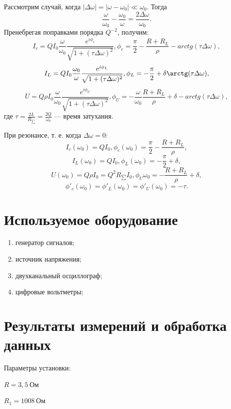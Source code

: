 \documentclass[a4paper, 12pt]{article}
\begin{document}
Рассмотрим случай, когда $|\Delta\omega|=|\omega-\omega_0|\ll\omega_0$. Тогда
$$\frac{\omega}{\omega_0}-\frac{\omega_0}{\omega}=\frac{2\Delta\omega}{\omega_0}.$$
Пренебрегая поправками порядка $Q^{-2}$, получим:
$$I_c=QI_0\frac{\omega}{\omega_0}\frac{e^{i\phi_c}}{\sqrt{1+(\tau\Delta\omega)^2}},    \phi_c=\frac{\pi}{2}-\frac{R+R_L}{\rho}-arctg(\tau\Delta\omega),$$
$$I_L=QI_0\frac{\omega_0}{\omega}\frac{e^{i\phi_L}}{\sqrt{1+(\tau\Delta\omega)^2}}, \phi_L=-\frac{\pi}{2}+\delta\arctg(\tau\Delta\omega),$$
$$U=Q\rho I_0\frac{\omega}{\omega_0}\frac{e^{i\phi_U}}{\sqrt{1+(\tau\Delta\omega)^2}}, \phi_U=-\frac{\omega}{\omega_0}\frac{R+R_L}{\rho}+\delta-arctg(\tau\Delta\omega),$$
где $\tau=\frac{2L}{R_{\sum}}=\frac{2Q}{\omega_0}$ --- время затухания.

При резонансе, т. е. когда $\Delta\omega=0$:
$$I_c(\omega_0)=QI_0, \phi_c(\omega_0)=\frac{\pi}{2}-\frac{R+R_L}{\rho},$$
$$I_L(\omega_0)=QI_0, \phi_L(\omega_0)=-\frac{\pi}{2}+\delta,$$
$$U(\omega_0)=Q\rho I_0=Q^2R_{\sum}I_0, \phi_U{\omega_0}=-\frac{R+R_L}{\rho}+\delta,$$
$$\phi'_c(\omega_0)=\phi'_L(\omega_0)=\phi'_U(\omega_0)=-\tau.$$
  	
\section{Используемое оборудование}

\begin{enumerate}
    \item генератор сигналов;
    \item источник напряжения;
    \item двухканальный осциллограф;
    \item цифровые вольтметры;
\end{enumerate}

\section{Результаты измерений и обработка данных}

Параметры установки:
\begin{description}
\item{} $R = 3,5~Ом$
\item{} $R_1 = 1008~Ом$
\end{description}
\end{document}
